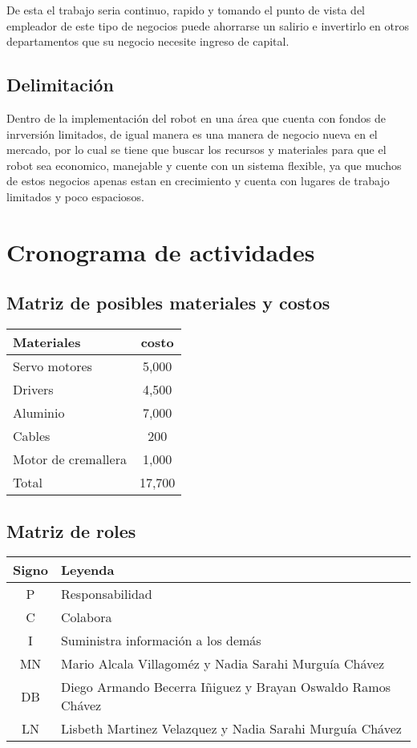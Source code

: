 \documentclass[letter,operight,12pt,spanish]{report}
\begin{document}
De esta el trabajo seria continuo, rapido y tomando el punto de vista del empleador de este tipo de negocios puede ahorrarse un salirio e invertirlo en otros departamentos que su negocio necesite ingreso de capital.

\subsection{Delimitaci\'on}

Dentro de la implementaci\'on del robot en una \'area que cuenta con fondos de inrversi\'on limitados, de igual manera es una manera de negocio nueva en el mercado, por lo cual se tiene que buscar los recursos y materiales para que el robot sea economico, manejable y cuente con un sistema flexible, ya que muchos de estos negocios apenas estan en crecimiento y cuenta con lugares de trabajo limitados y poco espaciosos.

\section{Cronograma de actividades}

\subsection{Matriz de posibles materiales y costos}

\begin{center}
\begin{tabular}{|l|c|}
\hline
	\textbf{Materiales} & \textbf{costo}\\
\hline
	Servo motores & 5,000\\
\hline
	Drivers & 4,500\\
\hline
	Aluminio & 7,000\\
\hline
	Cables & 200\\
\hline
	Motor de cremallera & 1,000\\
\hline
	Total & 17,700\\
\hline
\end{tabular}
\end{center}

\subsection{Matriz de roles}

\begin{center}
\begin{tabular}{|c|l|}
\hline
	\textbf{Signo} & \textbf{Leyenda}\\
\hline
	P & Responsabilidad\\
\hline
	C & Colabora\\
\hline
	I & Suministra informaci\'on a los dem\'as\\
\hline
	MN & Mario Alcala Villagom\'ez y Nadia Sarahi Murgu\'ia Ch\'avez\\
\hline
	DB & Diego Armando Becerra Iñiguez y Brayan Oswaldo Ramos Ch\'avez\\
\hline
	LN & Lisbeth Martinez Velazquez y Nadia Sarahi Murgu\'ia Ch\'avez\\
\hline
\end{tabular}
\end{center}
\end{document}
